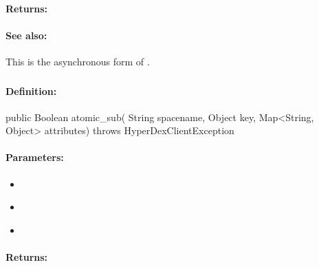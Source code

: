 \paragraph{Returns:}


\paragraph{See also:}  This is the asynchronous form of .

\pagebreak
\subsubsection{}
\label{api:java:atomic_sub}


\paragraph{Definition:}
\begin{javacode}
public Boolean atomic_sub(
        String spacename,
        Object key,
        Map<String, Object> attributes) throws HyperDexClientException
\end{javacode}

\paragraph{Parameters:}
\begin{itemize}[noitemsep]
\item {}\\

\item {}\\

\item {}\\

\end{itemize}

\paragraph{Returns:}


